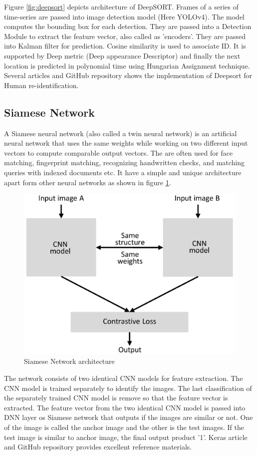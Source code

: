 Figure \ref{fig:deepsort} depicts architecture of DeepSORT. Frames of a series of time-series are passed into image detection model (Here YOLOv4). The model computes the bounding box for each detection. They are passed into a Detection Module to extract the feature vector, also called as 'encoders'. They are passed into Kalman filter for prediction. Cosine similarity is used to associate ID. It is supported by Deep metric (Deep appearance Descriptor) and finally the next location is predicted in polynomial time using Hungarian Assignment technique. Several articles \cite{deepsort_web}  \cite{theaiguyscode_deepsort} and GitHub repository \cite{obj_track_deep_yolo} shows the implementation of Deepsort for Human re-identification.


\subsection{Siamese Network}
A Siamese neural network (also called a twin neural network) is an artificial neural network that uses the same weights while working on two different input vectors to compute comparable output vectors. The are often used for face matching, fingerprint matching, recognizing handwritten checks, and matching queries with indexed documents etc. It have a simple and unique architecture apart form other neural networks as shown in figure \ref{fig:siamese}.

\begin{figure}[h!]
	\centering
	\includegraphics[width=0.5\linewidth]{Images/siamese}
	\caption{Siamese Network architecture}
	\label{fig:siamese}
\end{figure}
 
The network consists of two identical CNN models for feature extraction. The CNN model is trained separately to identify the images. The last classification of the separately trained CNN model is remove so that the feature vector is extracted. The feature vector from the two identical CNN model is passed into DNN layer os Siamese network that outputs if the images are similar or not. One of the image is called the anchor image and the other is the test images. If the test image is similar to anchor image, the final output product '1'. Keras article \cite{siamese_keras} and GitHub repository \cite{siamese_git} provides excellent reference materials.


